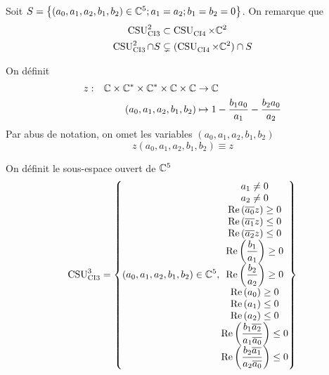   Soit \(S = \left\lbrace (a_0,a_1,a_2,b_1,b_2) \in \CC^5 ; a_1 = a_2 ; b_1 = b_2 = 0 \right\rbrace \). On remarque que
  \begin{align}
    \CSU[2]{CI3} & \subset \CSU{CI4}\times\CC^2
    \\
    \CSU[2]{CI3}\cap S & \subsetneq (\CSU{CI4}\times\CC^2)\cap S 
  \end{align}

    On définit 
    \begin{equation}
      \label{eq:fonction:z-ci3}
      \fonction{z}{\CC\times\CC^*\times\CC^*\times \CC \times \CC}{\CC}%
        {(a_0,a_1,a_2,b_1,b_2)}{1 - \frac{b_1a_0}{a_1} - \frac{b_2a_0}{a_2}}
    \end{equation}
    Par abus de notation, on omet les variables \( (a_0,a_1,a_2,b_1,b_2)\)
    \begin{equation}
       z(a_0,a_1,a_2,b_1,b_2) \equiv z
    \end{equation}
  \begin{defn}
    \label{def:csu:ci3-3}

    On définit le sous-espace ouvert de \(\CC^5\)
    \begin{equation*}
      \CSU[3]{CI3} = \left\lbrace
      (a_0,a_1,a_2,b_1,b_2) \in \CC^5,
      \begin{matrix}
        a_1 \not = 0
        \\
        a_2 \not = 0
        \\
        \Re\left(\conj{a_0}z\right) \ge 0
        \\
        \Re\left(\conj{a_1}z\right) \le 0
        \\
        \Re\left(\conj{a_2}z\right) \le 0
        \\
        \Re\left(\frac{b_1}{a_1}\right) \ge 0
        \\
        \Re\left(\frac{b_2}{a_2}\right) \ge 0
        \\
        \Re\left(a_0\right) \ge 0
        \\
        \Re\left(a_1\right) \le 0
        \\
        \Re\left(a_2\right) \le 0
        \\
        \Re\left(\frac{b_1\conj{a_2}}{a_1\conj{a_0}}\right) \le 0
        \\
        \Re\left(\frac{b_2\conj{a_1}}{a_2\conj{a_0}}\right) \le 0
      \end{matrix}
      \right\rbrace
    \end{equation*}
  \end{defn}


